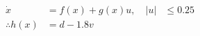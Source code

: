\documentclass[preview]{standalone}
\begin{document}
\begin{align*}
\dot x &= f(x) + g(x) u,  \quad |u| &\leq 0.25\\ \therefore h(x) &= d - 1.8 v
\end{align*}
\end{document}
